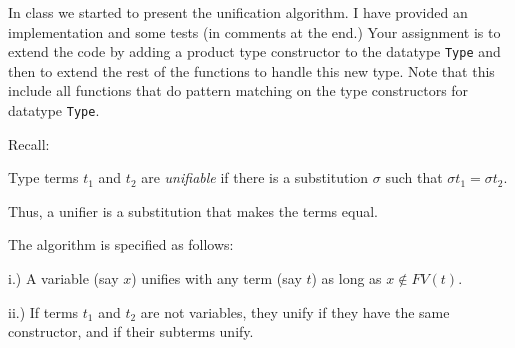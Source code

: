 \documentclass[11pt]{article}
\begin{document}


In class we started to present the unification algorithm.  I have
provided an implementation and some tests (in comments at the end.)
Your assignment is to extend the code by adding a product type
constructor to the datatype {\tt{Type}} and then to extend the rest of
the functions to handle this new type.  Note that this include all
functions that do pattern matching on the type constructors for
datatype {\tt{Type}}.

Recall:

\begin{definition}
Type terms $t_1$ and $t_2$ are {\em{unifiable}} if there is a substitution
$\sigma$ such that $\sigma t_1 = \sigma t_2$.
\end{definition}

Thus, a unifier is a substitution that makes the terms equal.  

The algorithm is specified as follows:

\begin{description}
\item{i.)} A variable (say $x$) unifies with any term (say $t$) as long as $x\not\in{} FV(t)$.
\item{ii.)} If terms $t_1$ and $t_2$ are not variables, they unify if
  they have the same constructor, and if their subterms unify.
\end{description}
\end{document}
